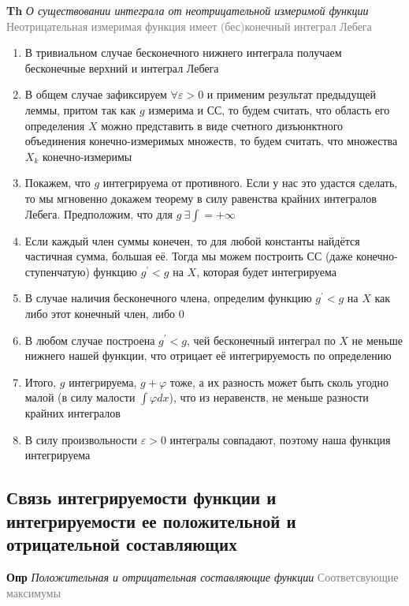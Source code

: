 \textbf{Th} \textit{О существовании интеграла от неотрицательной измеримой функции} \textcolor{gray}{
    Неотрицательная измеримая функция имеет (бес)конечный интеграл Лебега}

\begin{enumerate}
    \item В тривиальном случае бесконечного нижнего интеграла получаем бесконечные верхний и интеграл Лебега
    \item В общем случае зафиксируем $\forall \varepsilon > 0$ и применим результат предыдущей леммы, притом так как $g$
    измерима и СС, то будем считать, что область его определения $X$ можно представить в виде счетного
    дизъюнктного объединения конечно-измеримых множеств, то будем считать, что множества $X_k$ конечно-измеримы
    \item Покажем, что $g$ интегрируема от противного.
    Если у нас это удастся сделать, то мы мгновенно докажем теорему в силу равенства крайних интегралов Лебега.
    Предположим, что для $g~\exists\int = +\infty $
    \item Если каждый член суммы конечен, то для любой константы найдётся частичная сумма, большая её.
    Тогда мы можем построить СС (даже конечно-ступенчатую) функцию $g^{'}< g$ на $X$, которая будет интегрируема
    \item В случае наличия бесконечного члена, определим функцию $g^{'}< g$ на $X$ как либо этот конечный член,
    либо 0
    \item В любом случае построена $g^{'}< g$, чей бесконечный интеграл по $X$ не меньше нижнего нашей функции,
    что отрицает её интегрируемость по определению
    \item Итого, $g$ интегрируема, $g + \varphi$ тоже, а их разность может быть сколь угодно малой (в силу малости
    $\int \varphi dx$), что из неравенств, не меньше разности крайних интегралов
    \item В силу произвольности $\varepsilon > 0$ интегралы совпадают, поэтому наша функция интегрируема
\end{enumerate}

\subsection{Связь интегрируемости функции и интегрируемости ее положительной и отрицательной составляющих}

\textbf{Опр} \textit{Положительная и отрицательная составляющие функции} \textcolor{gray}{Соответсвующие максимумы}

